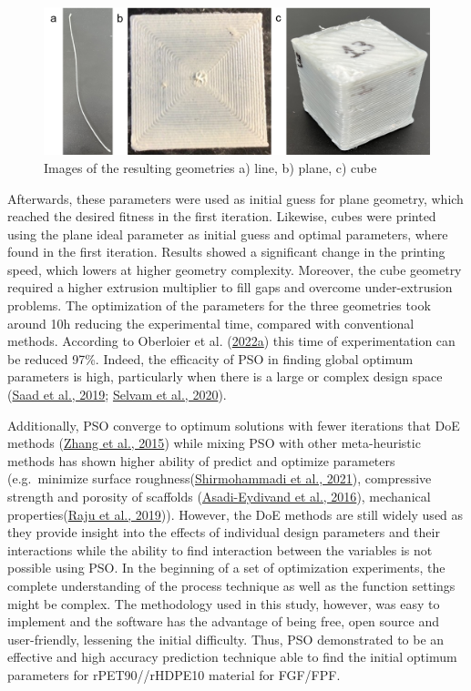 \documentclass[
  12pt,
]{article}
\begin{document}
\begin{figure}

{\centering \includegraphics{figures/Figure_9_geometries.png}

}

\caption{\label{fig-geometries}Images of the resulting geometries a)
line, b) plane, c) cube}

\end{figure}

Afterwards, these parameters were used as initial guess for plane
geometry, which reached the desired fitness in the first iteration.
Likewise, cubes were printed using the plane ideal parameter as initial
guess and optimal parameters, where found in the first iteration.
Results showed a significant change in the printing speed, which lowers
at higher geometry complexity. Moreover, the cube geometry required a
higher extrusion multiplier to fill gaps and overcome under-extrusion
problems. The optimization of the parameters for the three geometries
took around 10h reducing the experimental time, compared with
conventional methods. According to Oberloier et al.
(\protect\hyperlink{ref-oberloier2022}{2022a}) this time of
experimentation can be reduced 97\%. Indeed, the efficacity of PSO in
finding global optimum parameters is high, particularly when there is a
large or complex design space (\protect\hyperlink{ref-saad2019a}{Saad et
al., 2019}; \protect\hyperlink{ref-selvam2020}{Selvam et al., 2020}).

Additionally, PSO converge to optimum solutions with fewer iterations
that DoE methods (\protect\hyperlink{ref-zhang2015}{Zhang et al., 2015})
while mixing PSO with other meta-heuristic methods has shown higher
ability of predict and optimize parameters (e.g.~minimize surface
roughness(\protect\hyperlink{ref-shirmohammadi2021}{Shirmohammadi et
al., 2021}), compressive strength and porosity of scaffolds
(\protect\hyperlink{ref-asadi-eydivand2016}{Asadi-Eydivand et al.,
2016}), mechanical properties(\protect\hyperlink{ref-raju2019}{Raju et
al., 2019})). However, the DoE methods are still widely used as they
provide insight into the effects of individual design parameters and
their interactions while the ability to find interaction between the
variables is not possible using PSO. In the beginning of a set of
optimization experiments, the complete understanding of the process
technique as well as the function settings might be complex. The
methodology used in this study, however, was easy to implement and the
software has the advantage of being free, open source and user-friendly,
lessening the initial difficulty. Thus, PSO demonstrated to be an
effective and high accuracy prediction technique able to find the
initial optimum parameters for rPET90//rHDPE10 material for FGF/FPF.
\end{document}
